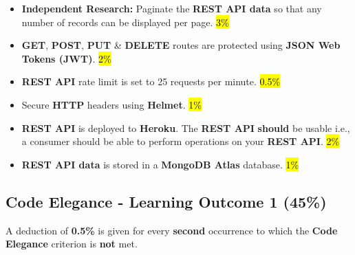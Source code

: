 \documentclass{article}
\begin{document}
\begin{itemize}
  \item \textbf{Independent Research:} Paginate the \textbf{REST API data} so that any number of records can be displayed per page. \hl{3\%}
  \item \textbf{GET}, \textbf{POST}, \textbf{PUT} \& \textbf{DELETE} routes are protected using \textbf{JSON Web Tokens (JWT)}. \hl{2\%}
  \item \textbf{REST API} rate limit is set to 25 requests per minute. \hl{0.5\%}
  \item Secure \textbf{HTTP} headers using \textbf{Helmet}. \hl{1\%}
  \item \textbf{REST API} is deployed to \textbf{Heroku}. The \textbf{REST API} \textbf{should} be usable i.e., a consumer should be able to perform operations on your \textbf{REST API}. \hl{2\%}
  \item \textbf{REST API data} is stored in a \textbf{MongoDB Atlas} database. \hl{1\%}
\end{itemize}

\subsection*{Code Elegance - Learning Outcome 1 (45\%)}

A deduction of \textbf{0.5\%} is given for every \textbf{second} occurrence to which the \textbf{Code Elegance} criterion is \textbf{not} met.
\end{document}
